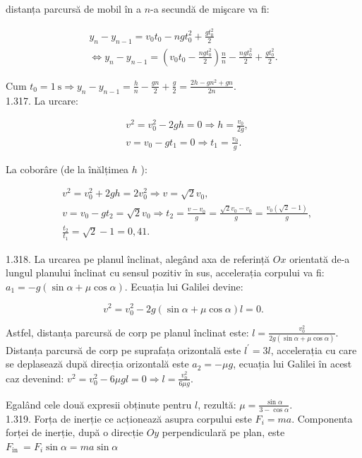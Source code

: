 \documentclass[10pt]{article}
\begin{document}
distanța parcursă de mobil în a $n$-a secundă de mişcare va fi:

$$
\begin{gathered}
y_{n}-y_{n-1}=v_{0} t_{0}-n g t_{0}^{2}+\frac{g t_{0}^{2}}{2} \\
\Leftrightarrow y_{n}-y_{n-1}=\left(v_{0} t_{0}-\frac{n g t_{0}^{2}}{2}\right) \frac{n}{n}-\frac{n g t_{0}^{2}}{2}+\frac{g t_{0}^{2}}{2} .
\end{gathered}
$$

Cum $t_{0}=1 \mathrm{~s} \Rightarrow y_{n}-y_{n-1}=\frac{h}{n}-\frac{g n}{2}+\frac{g}{2}=\frac{2 h-g n^{2}+g n}{2 n}$.\\
1.317. La urcare:

$$
\begin{aligned}
& v^{2}=v_{0}^{2}-2 g h=0 \Rightarrow h=\frac{v_{0}}{2 g}, \\
& v=v_{0}-g t_{1}=0 \Rightarrow t_{1}=\frac{v_{0}}{g} .
\end{aligned}
$$

La coborâre (de la înălțimea $h$ ):

$$
\begin{aligned}
& v^{2}=v_{0}^{2}+2 g h=2 v_{0}^{2} \Rightarrow v=\sqrt{2} v_{0}, \\
& v=v_{0}-g t_{2}=\sqrt{2} v_{0} \Rightarrow t_{2}=\frac{v-v_{0}}{g}=\frac{\sqrt{2} v_{0}-v_{0}}{g}=\frac{v_{0}(\sqrt{2}-1)}{g}, \\
& \frac{t_{2}}{t_{1}}=\sqrt{2}-1=0,41 .
\end{aligned}
$$

1.318. La urcarea pe planul înclinat, alegând axa de referință $O x$ orientată de-a lungul planului înclinat cu sensul pozitiv în sus, accelerația corpului va fi: $a_{1}=-g(\sin \alpha+\mu \cos \alpha)$. Ecuația lui Galilei devine:

$$
v^{2}=v_{0}^{2}-2 g(\sin \alpha+\mu \cos \alpha) l=0 .
$$

Astfel, distanța parcursă de corp pe planul înclinat este: $l=\frac{v_{0}^{2}}{2 g(\sin \alpha+\mu \cos \alpha)}$.\\
Distanța parcursă de corp pe suprafața orizontală este $l^{\prime}=3 l$, accelerația cu care se deplasează după direcția orizontală este $a_{2}=-\mu g$, ecuația lui Galilei în acest caz devenind: $v^{2}=v_{0}^{2}-6 \mu g l=0 \Rightarrow l=\frac{v_{0}^{2}}{6 \mu g}$.

Egalând cele două expresii obținute pentru $l$, rezultă: $\mu=\frac{\sin \alpha}{3-\cos \alpha}$.\\
1.319. Forța de inerție ce acționează asupra corpului este $F_{i}=m a$. Componenta forței de inerție, după o direcție $O y$ perpendiculară pe plan, este $F_{\text {in }}=F_{i} \sin \alpha=m a \sin \alpha$
\end{document}
